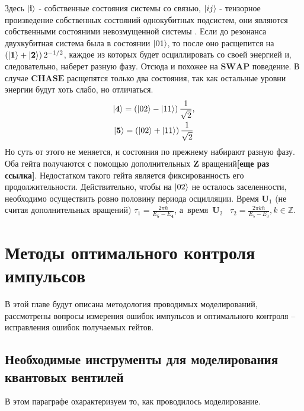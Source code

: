 \documentclass[12pt, twoside]{report}
\DeclarePairedDelimiter\ket{\lvert}{\rangle}
\numberwithin{equation}{section}
\numberwithin{figure}{section}
\begin{document}
Здесь $\ket{\mathbf{i}}$ - собственные состояния системы со связью, $\ket{ij}$ - тензорное произведение собственных состояний однокубитных подсистем, они являются собственными состояними невозмущенной системы . Если до резонанса двухкубитная система была в состоянии $\ket{01}$, то после оно расщепится на $\left( \ket{\mathbf{1}} + \ket{\mathbf{2}} \right) 2^{-1/2}$, каждое из которых будет осциллировать со своей энергией и, следовательно, наберет разную фазу. Отсюда и похожее на $\mathbf{SWAP}$ поведение. 
\newline{}
\newline{}
В случае $\mathbf{CHASE}$ расщепятся только два состояния, так как остальные уровни энергии будут хоть слабо, но отличаться. 
\begin{gather*}
\ket{\mathbf{4}}  = \left( \ket{02} - \ket{11} \right) \frac{1}{\sqrt{2}}, \\
\ket{\mathbf{5}}  = \left( \ket{02} + \ket{11} \right) \frac{1}{\sqrt{2}}
\end{gather*}
Но суть от этого не меняется, и состояния по прежнему набирают разную фазу. Оба гейта получаются с помощью дополнительных $\mathbf{Z}$ вращений\textbf{[еще раз ссылка]}. Недостатком такого гейта является фиксированность его продолжительности. Действительно, чтобы на $\ket{02}$ не осталось заселенности, необходимо осуществить ровно половину периода осцилляции. Время $\mathbf{U}_1$ (не считая дополнительных вращений) $\tau_1 = \frac{2 \pi \hbar }{E_\mathbf{5} - E_\mathbf{4}}$, а~время~$\mathbf{U}_2$~ $\tau_2 = \frac{2 \pi k \hbar}{E_5 - E_3}, k \in \mathbb{Z}$.

\chapter{Методы оптимального контроля импульсов}
В этой главе будут описана методология проводимых моделирований, рассмотрены вопросы измерения ошибок импульсов и оптимального контроля -- исправления ошибок получаемых гейтов.
\section{Необходимые инструменты для моделирования квантовых вентилей}
В этом параграфе охарактеризуем то, как проводилось моделирование.
\end{document}
